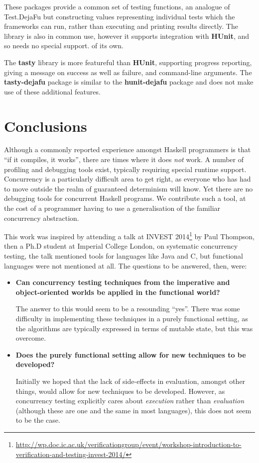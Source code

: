 These packages provide a common set of testing functions, an analogue
of Test.DejaFu but constructing values representing individual tests
which the frameworks can run, rather than executing and printing
results directly.  The  library is also in
common use, however it supports integration with \textbf{HUnit}, and
so needs no special support. of its own.

The \textbf{tasty} library is more featureful than \textbf{HUnit},
supporting progress reporting, giving a message on success as well as
failure, and command-line arguments.  The \textbf{tasty-dejafu}
package is similar to the \textbf{hunit-dejafu} package and does not
make use of these additional features.

\section{Conclusions}
\label{sec:dejafu-conclusions}

Although a commonly reported experience amongst Haskell programmers is
that ``if it compiles, it works'', there are times where it does
\emph{not} work.  A number of profiling and debugging tools exist,
typically requiring special runtime support.  Concurrency is a
particularly difficult area to get right, as everyone who has had to
move outside the realm of guaranteed determinism will know.  Yet there
are no debugging tools for concurrent Haskell programs.  We contribute
such a tool, at the cost of a programmer having to use a
generalisation of the familiar concurrency abstraction.

This work was inspired by attending a talk at INVEST
2014\footnote{\url{http://wp.doc.ic.ac.uk/verificationgroup/event/workshop-introduction-to-verification-and-testing-invest-2014/}}
by Paul Thompson, then a Ph.D student at Imperial College London, on
systematic concurrency testing, the talk mentioned tools for languages
like Java and C, but functional languages were not mentioned at all.
The questions to be answered, then, were:

\begin{itemize}
\item \textbf{Can concurrency testing techniques from the imperative
    and object-oriented worlds be applied in the functional world?}
  \hfill

  The answer to this would seem to be a resounding ``yes''.  There was
  some difficulty in implementing these techniques in a purely
  functional setting, as the algorithms are typically expressed in
  terms of mutable state, but this was overcome.

\item \textbf{Does the purely functional setting allow for new
    techniques to be developed?} \hfill

  Initially we hoped that the lack of side-effects in evaluation,
  amongst other things, would allow for new techniques to be
  developed.  However, as concurrency testing explicitly cares about
  \emph{execution} rather than \emph{evaluation} (although these are
  one and the same in most languages), this does not seem to be the
  case.
\end{itemize}

